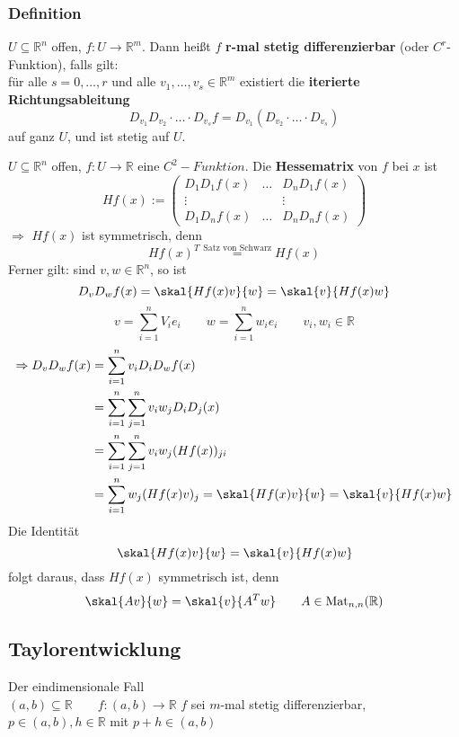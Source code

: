 \subsubsection{Definition} %
\label{ssub:definition}
$U \subseteq \mathbb{R}^n$ offen, $f: U \to \mathbb{R}^m$. Dann heißt $f$ {\bfseries r-mal stetig differenzierbar} (oder $C^r$-Funktion), falls gilt: \\
 für alle $s=0,\dots,r$ und alle $v_1,\dots,v_s \in \mathbb{R}^m$ existiert die {\bfseries iterierte Richtungsableitung}
 \[
 	D_{v_1}D_{v_2} \cdot \dots \cdot D_{v_s}f = D_{v_1}(D_{v_2} \cdot \dots \cdot D_{v_s}) 
 \]
 auf ganz $U$, und ist stetig auf $U$.
 
 $U \subseteq \mathbb{R}^n$ offen, $f: U \to \mathbb{R}$ eine $C^2-Funktion$. Die {\bfseries Hessematrix} von $f$ bei $x$ ist
 \[
 	Hf(x):= \begin{pmatrix}
 		D_1D_1f(x) & \dots & D_nD_1f(x) \\
		\vdots & & \vdots \\
		D_1D_nf(x) & \dots & D_nD_nf(x)
 	\end{pmatrix}
 \]
 $\Rightarrow$ $Hf(x)$ ist symmetrisch, denn
 \[
 	Hf(x)^T \stackrel{\text{Satz von Schwarz}}{=} Hf(x)
 \] 
 Ferner gilt: sind $v,w \in \mathbb{R}^n$, so ist
 \[
 	D_vD_wf(x)= \skal{Hf(x)v}{w}=\skal{v}{Hf(x)w}
 \]
  \[
 	v= \sum^{n}_{i=1}V_ie_i \qquad w=\sum^{n}_{i=1}w_ie_i \qquad v_i,w_i \in \mathbb{R}
 \]
\begin{align*}
	\Rightarrow D_vD_wf(x)&= \sum^{n}_{i=1}v_iD_iD_wf(x) \\ &= \sum^{n}_{i=1}\sum^{n}_{j=1}v_iw_jD_iD_j(x) \\ &= \sum^{n}_{i=1}\sum^{n}_{j=1}v_iw_j(Hf(x))_{ji} \\
	&= \sum^{n}_{i=1}w_j(Hf(x)v)_j = \skal{Hf(x)v}{w}= \skal{v}{Hf(x)w}
\end{align*}
Die Identität
\[
	\skal{Hf(x)v}{w}=\skal{v}{Hf(x)w} 
\] folgt daraus, dass $Hf(x)$ symmetrisch ist, denn
\[
	\skal{Av}{w}=\skal{v}{A^Tw} \qquad A \in \Mat_{n,n}(\mathbb{R})
\]
\subsection{Taylorentwicklung} %
\label{sub:taylorentwicklung}
Der eindimensionale Fall \\
$(a,b) \subseteq \mathbb{R} \qquad f:(a,b) \to \mathbb{R}$
$f$ sei $m$-mal stetig differenzierbar, $p \in (a,b), h \in \mathbb{R}$ mit $p+h \in (a,b)$

